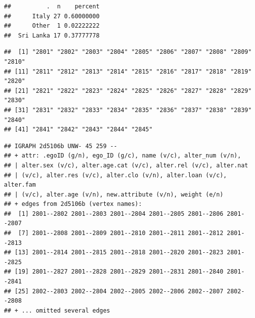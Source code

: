 \documentclass[
]{book}
\newenvironment{Shaded}{\begin{snugshade}}{\end{snugshade}}
\newcommand{\CommentTok}[1]{\textcolor[rgb]{0.56,0.35,0.01}{\textit{#1}}}
\newcommand{\DecValTok}[1]{\textcolor[rgb]{0.00,0.00,0.81}{#1}}
\newcommand{\FunctionTok}[1]{\textcolor[rgb]{0.00,0.00,0.00}{#1}}
\newcommand{\NormalTok}[1]{#1}
\newcommand{\OtherTok}[1]{\textcolor[rgb]{0.56,0.35,0.01}{#1}}
\newcommand{\SpecialCharTok}[1]{\textcolor[rgb]{0.00,0.00,0.00}{#1}}
\begin{document}
\begin{Shaded}
\end{Shaded}

\begin{verbatim}
##          .  n    percent
##      Italy 27 0.60000000
##      Other  1 0.02222222
##  Sri Lanka 17 0.37777778
\end{verbatim}

\begin{Shaded}
\end{Shaded}

\begin{verbatim}
##  [1] "2801" "2802" "2803" "2804" "2805" "2806" "2807" "2808" "2809" "2810"
## [11] "2811" "2812" "2813" "2814" "2815" "2816" "2817" "2818" "2819" "2820"
## [21] "2821" "2822" "2823" "2824" "2825" "2826" "2827" "2828" "2829" "2830"
## [31] "2831" "2832" "2833" "2834" "2835" "2836" "2837" "2838" "2839" "2840"
## [41] "2841" "2842" "2843" "2844" "2845"
\end{verbatim}

\begin{Shaded}
\end{Shaded}

\begin{verbatim}
## IGRAPH 2d5106b UNW- 45 259 -- 
## + attr: .egoID (g/n), ego_ID (g/c), name (v/c), alter_num (v/n),
## | alter.sex (v/c), alter.age.cat (v/c), alter.rel (v/c), alter.nat
## | (v/c), alter.res (v/c), alter.clo (v/n), alter.loan (v/c), alter.fam
## | (v/c), alter.age (v/n), new.attribute (v/n), weight (e/n)
## + edges from 2d5106b (vertex names):
##  [1] 2801--2802 2801--2803 2801--2804 2801--2805 2801--2806 2801--2807
##  [7] 2801--2808 2801--2809 2801--2810 2801--2811 2801--2812 2801--2813
## [13] 2801--2814 2801--2815 2801--2818 2801--2820 2801--2823 2801--2825
## [19] 2801--2827 2801--2828 2801--2829 2801--2831 2801--2840 2801--2841
## [25] 2802--2803 2802--2804 2802--2805 2802--2806 2802--2807 2802--2808
## + ... omitted several edges
\end{verbatim}
\end{document}
